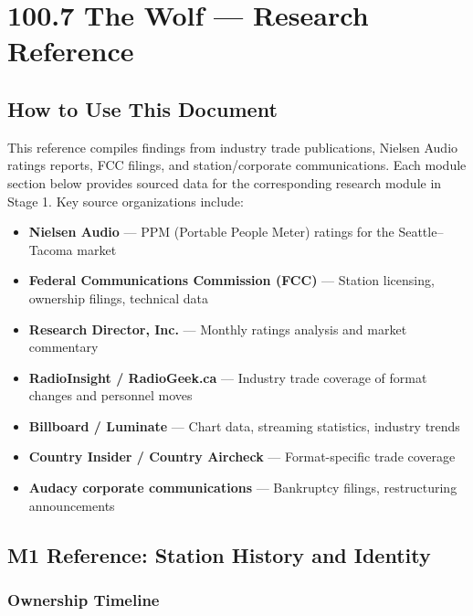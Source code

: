 \documentclass[11pt,letterpaper]{article}
\begin{document}
\section{100.7 The Wolf --- Research Reference}

\subsection{How to Use This Document}

This reference compiles findings from industry trade publications, Nielsen Audio ratings reports, FCC filings, and station/corporate communications. Each module section below provides sourced data for the corresponding research module in Stage 1. Key source organizations include:

\begin{itemize}[leftmargin=2em]
\item \textbf{Nielsen Audio} --- PPM (Portable People Meter) ratings for the Seattle--Tacoma market
\item \textbf{Federal Communications Commission (FCC)} --- Station licensing, ownership filings, technical data
\item \textbf{Research Director, Inc.} --- Monthly ratings analysis and market commentary
\item \textbf{RadioInsight / RadioGeek.ca} --- Industry trade coverage of format changes and personnel moves
\item \textbf{Billboard / Luminate} --- Chart data, streaming statistics, industry trends
\item \textbf{Country Insider / Country Aircheck} --- Format-specific trade coverage
\item \textbf{Audacy corporate communications} --- Bankruptcy filings, restructuring announcements
\end{itemize}

\subsection{M1 Reference: Station History and Identity}

\subsubsection{Ownership Timeline}
\end{document}
